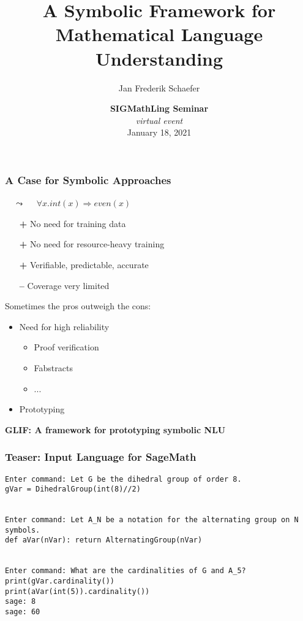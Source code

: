 \documentclass[aspectratio=169]{beamer}
\title{A Symbolic Framework for Mathematical Language Understanding}
\author{Jan Frederik Schaefer}
\institute{FAU Erlangen-N\"urnberg}
\date{\textbf{SIGMathLing Seminar} \\ \textit{virtual event} \\ January 18, 2021 }
\begin{document}
\frame\titlepage

\begin{frame}
    \frametitle{A Case for Symbolic Approaches}
    {
        \centering
         $\quad\leadsto\quad$ {\color{logicfg}$\forall x.int(x) \Rightarrow even(x)$}\par
    }

    \vspace{1em}
    \begin{itemize}
        \item[\textbf{+}] No need for training data
        \item[\textbf{+}] No need for resource-heavy training
        \item[\textbf{+}] Verifiable, predictable, accurate
        \item[\textbf{--\hspace{0.15em}}] Coverage very limited
    \end{itemize}

    \vspace{1em}
    Sometimes the pros outweigh the cons:
    \begin{itemize}
        \item Need for high reliability
            \begin{itemize}
                \item Proof verification
                \item Fabstracts
                \item ...
            \end{itemize}
        \item Prototyping
    \end{itemize}

    \pause
    \centering
    \vspace{1em}
    \bfseries GLIF: A framework for prototyping symbolic NLU
\end{frame}

\begin{frame}[fragile]
    \frametitle{Teaser: Input Language for SageMath}
    \begin{lstlisting}
Enter command: Let G be the dihedral group of order 8.
gVar = DihedralGroup(int(8)//2)


Enter command: Let A_N be a notation for the alternating group on N symbols.
def aVar(nVar): return AlternatingGroup(nVar)


Enter command: What are the cardinalities of G and A_5?
print(gVar.cardinality())
print(aVar(int(5)).cardinality())
sage: 8
sage: 60
    \end{lstlisting}
\end{frame}
\end{document}

